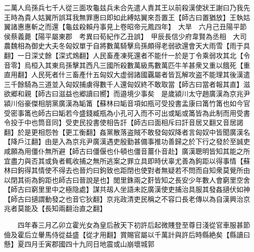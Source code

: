 二萬人烏孫兵七千人從三面攻龜兹兵未合先遣人責其王以前殺漢使狀王謝曰乃我先王時為貴人姑翼所誤耳我無罪惠曰即如此縛姑翼來吾置王【師古曰置猶放】王執姑翼諸惠惠斬之而還【龜兹殺賴丹事見上卷昭帝元鳳四年】　大旱　六月己丑陽平節侯蔡義薨【陽平屬東郡　考異曰荀紀作乙丑誤】　甲辰長信少府韋賢為丞相　大司農魏相為御史大夫冬匈奴單于自將數萬騎擊烏孫頗得老弱欲還會天大雨雪【雨于具翻】一日深丈餘【深式鴆翻】人民畜產凍死還者不能什一於是丁令乘弱攻其北【令音零】烏桓入其東烏孫擊其西凡三國所殺數萬級馬數萬匹牛羊甚衆又重以餓死【重直用翻】人民死者什三畜產什五匈奴大虚弱諸國覊屬者皆瓦解攻盗不能理其後漢遣三千餘騎為三道並入匈奴捕虜得數千人還匈奴終不敢取當【師古曰當者報其直】滋欲郷和親【師古曰滋益也郷讀曰嚮】而邉境少事矣　是歲潁川太守趙廣漢為京兆尹潁川俗豪傑相朋黨廣漢為缿筩【蘇林曰缿音項如瓶可受投書孟康曰筩竹筩也如今官受密事筩也師古曰缿若今盛錢臧瓶為小孔可入而不可出或缿或筩皆為此制而用受書令投于中也筒音同】受吏民投書使相告訐【師古曰面相斥曰訐音居又翻又音居謁翻】於是更相怨咎【更工衡翻】姦黨散落盗賊不敢發匈奴降者言匈奴中皆聞廣漢名【降戶江翻】由是入為京兆尹廣漢遇吏殷勤甚備事推功善歸之於下行之發於至誠吏咸願為用僵仆無所避【師古曰僵偃也仆頓也僵音薑仆音赴】廣漢聰明皆知其能之所宜盡力與否其或負者輒收捕之無所逃案之罪立具即時伏辜尤善為鉤距以得事情【蘇林曰鉤得其情使不得去也晉灼曰鉤致也距閉也使對者無疑若不問而自知衆莫覺所由以閉其術為鉤距也師古曰晉說是也】閭里銖兩之姧皆知之長安少年數人會窮里空舍【師古曰窮里里中之極隐處】謀共刼人坐語未訖廣漢使吏捕治具服其發姦擿伏如神【師古曰擿謂動發之也音它狄翻】京兆政清吏民稱之不容口長老傳以為自漢興治京兆者莫能及【長知兩翻治直之翻】

　　四年春三月乙卯立霍光女為皇后赦天下初許后起微賤登至尊日淺從官車服甚節儉及霍后立轝馬侍從益盛【從才用翻】賞賜官屬以千萬計與許后時縣絶矣【縣讀曰懸】夏四月壬寅郡國四十九同日地震或山崩壞城郭

